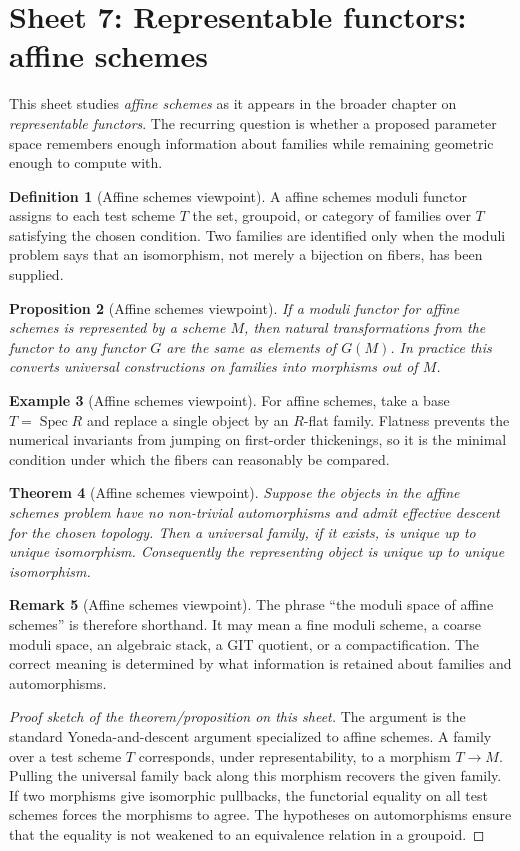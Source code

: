 \documentclass[11pt]{amsart}
\newtheorem{theorem}{Theorem}[section]
\newtheorem{proposition}[theorem]{Proposition}
\theoremstyle{definition}
\newtheorem{definition}[theorem]{Definition}
\newtheorem{example}[theorem]{Example}
\newtheorem{remark}[theorem]{Remark}
\newcommand{\Spec}{\operatorname{Spec}}
\begin{document}
\section{Sheet 7: Representable functors: affine schemes}
This sheet studies \emph{affine schemes} as it appears in the broader chapter on \emph{representable functors}.  The recurring question is whether a proposed parameter space remembers enough information about families while remaining geometric enough to compute with.
\begin{definition}[Affine schemes viewpoint]
A affine schemes moduli functor assigns to each test scheme $T$ the set, groupoid, or category of families over $T$ satisfying the chosen condition.  Two families are identified only when the moduli problem says that an isomorphism, not merely a bijection on fibers, has been supplied.
\end{definition}
\begin{proposition}[Affine schemes viewpoint]
If a moduli functor for affine schemes is represented by a scheme $M$, then natural transformations from the functor to any functor $G$ are the same as elements of $G(M)$.  In practice this converts universal constructions on families into morphisms out of $M$.
\end{proposition}
\begin{example}[Affine schemes viewpoint]
For affine schemes, take a base $T=\Spec R$ and replace a single object by an $R$-flat family.  Flatness prevents the numerical invariants from jumping on first-order thickenings, so it is the minimal condition under which the fibers can reasonably be compared.
\end{example}
\begin{theorem}[Affine schemes viewpoint]
Suppose the objects in the affine schemes problem have no non-trivial automorphisms and admit effective descent for the chosen topology.  Then a universal family, if it exists, is unique up to unique isomorphism.  Consequently the representing object is unique up to unique isomorphism.
\end{theorem}
\begin{remark}[Affine schemes viewpoint]
The phrase ``the moduli space of affine schemes'' is therefore shorthand.  It may mean a fine moduli scheme, a coarse moduli space, an algebraic stack, a GIT quotient, or a compactification.  The correct meaning is determined by what information is retained about families and automorphisms.
\end{remark}
\begin{proof}[Proof sketch of the theorem/proposition on this sheet]
The argument is the standard Yoneda-and-descent argument specialized to affine schemes.  A family over a test scheme $T$ corresponds, under representability, to a morphism $T\to M$.  Pulling the universal family back along this morphism recovers the given family.  If two morphisms give isomorphic pullbacks, the functorial equality on all test schemes forces the morphisms to agree.  The hypotheses on automorphisms ensure that the equality is not weakened to an equivalence relation in a groupoid.
\end{proof}
\end{document}
